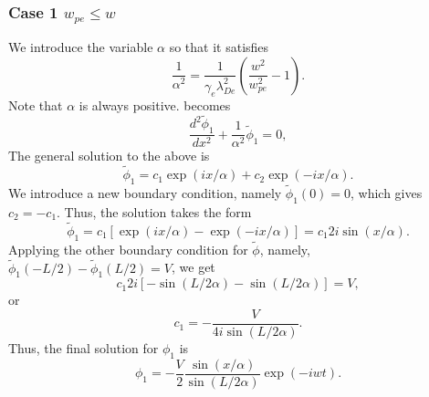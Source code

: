 \documentclass[a4paper,11pt]{report}
\begin{document}
\subsubsection{Case 1 $w_{pe} \le w$}
We introduce the variable $\alpha$ so that it satisfies
\begin{equation}
    \frac{1}{\alpha^2} = \frac{1}{\gamma_e \lambda^2_{De}} \left( \frac{w^2}{w^2_{pe}} - 1 \right).
\end{equation}
Note that $\alpha$ is always positive.  becomes 
\begin{equation}
    \frac{d^2 \tilde{\phi}_1}{dx^2} + \frac{1}{\alpha^2} \tilde{\phi}_1 = 0,
\end{equation}
The general solution to the above is
\begin{equation*}
    \tilde{\phi}_1 = c_1 \exp (i x / \alpha) + c_2 \exp (-i x / \alpha).
\end{equation*}
We introduce a new boundary condition, namely $\tilde{\phi}_1(0) = 0$, which gives $c_2 = -c_1$. Thus, the solution takes the form
\begin{equation*}
    \tilde{\phi}_1 = c_1 \left[ \exp (i x / \alpha) - \exp (-i x / \alpha) \right] = c_1 2i \sin ( x / \alpha ).
\end{equation*}
Applying the other boundary condition for $\tilde{\phi}$, namely, $\tilde{\phi}_1(-L/2) - \tilde{\phi}_1(L/2) = V$, we get
\begin{equation*}
    c_1 2i \left[ -\sin \left( L / 2\alpha \right) - \sin \left( L / 2\alpha \right) \right] = V,
\end{equation*}
or
\begin{equation*}
    c_1 = - \frac{V}{4i \sin \left( L / 2\alpha \right)}.
\end{equation*}
Thus, the final solution for $\phi_1$ is
\begin{equation}
    \phi_1 = - \frac{V}{2} \frac{\sin (x / \alpha)}{\sin (L / 2\alpha)} \exp(-iwt).
\end{equation}
\end{document}
